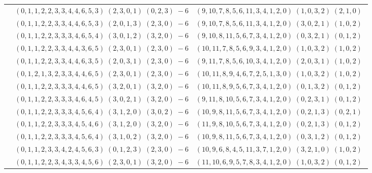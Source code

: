 \documentclass[11pt]{article}
\begin{document}
\begin{longtable}[l]{|c|c|c|}
 \cline{2-3} 
 & $(0 ,1 ,1 ,2 ,2 ,3 ,3 ,4 ,4 ,6 ,5 ,3) \;(2 ,3 ,0 ,1) \;(0 ,2 ,3) \;-6$ & $(9 ,10 ,7 ,8 ,5 ,6 ,11 ,3 ,4 ,1 ,2 ,0) \;(1 ,0 ,3 ,2) \;(2 ,1 ,0) \;$\\ 
 \cline{2-3} 
 & $(0 ,1 ,1 ,2 ,2 ,3 ,3 ,4 ,4 ,6 ,5 ,3) \;(2 ,0 ,1 ,3) \;(2 ,3 ,0) \;-6$ & $(9 ,10 ,7 ,8 ,5 ,6 ,11 ,3 ,4 ,1 ,2 ,0) \;(3 ,0 ,2 ,1) \;(1 ,0 ,2) \;$\\ 
 \cline{2-3} 
 & $(0 ,1 ,1 ,2 ,2 ,3 ,3 ,3 ,4 ,6 ,5 ,4) \;(3 ,0 ,1 ,2) \;(3 ,2 ,0) \;-6$ & $(9 ,10 ,8 ,11 ,5 ,6 ,7 ,3 ,4 ,1 ,2 ,0) \;(0 ,3 ,2 ,1) \;(0 ,1 ,2) \;$\\ 
 \cline{2-3} 
 & $(0 ,1 ,1 ,2 ,2 ,3 ,3 ,4 ,4 ,3 ,6 ,5) \;(2 ,3 ,0 ,1) \;(2 ,3 ,0) \;-6$ & $(10 ,11 ,7 ,8 ,5 ,6 ,9 ,3 ,4 ,1 ,2 ,0) \;(1 ,0 ,3 ,2) \;(1 ,0 ,2) \;$\\ 
 \cline{2-3} 
 & $(0 ,1 ,1 ,2 ,2 ,3 ,3 ,4 ,4 ,6 ,3 ,5) \;(2 ,0 ,3 ,1) \;(2 ,3 ,0) \;-6$ & $(9 ,11 ,7 ,8 ,5 ,6 ,10 ,3 ,4 ,1 ,2 ,0) \;(2 ,0 ,3 ,1) \;(1 ,0 ,2) \;$\\ 
 \cline{2-3} 
 & $(0 ,1 ,2 ,1 ,3 ,2 ,3 ,3 ,4 ,4 ,6 ,5) \;(2 ,3 ,0 ,1) \;(2 ,3 ,0) \;-6$ & $(10 ,11 ,8 ,9 ,4 ,6 ,7 ,2 ,5 ,1 ,3 ,0) \;(1 ,0 ,3 ,2) \;(1 ,0 ,2) \;$\\ 
 \cline{2-3} 
 & $(0 ,1 ,1 ,2 ,2 ,3 ,3 ,3 ,4 ,4 ,6 ,5) \;(3 ,2 ,0 ,1) \;(3 ,2 ,0) \;-6$ & $(10 ,11 ,8 ,9 ,5 ,6 ,7 ,3 ,4 ,1 ,2 ,0) \;(0 ,1 ,3 ,2) \;(0 ,1 ,2) \;$\\ 
 \cline{2-3} 
 & $(0 ,1 ,1 ,2 ,2 ,3 ,3 ,3 ,4 ,6 ,4 ,5) \;(3 ,0 ,2 ,1) \;(3 ,2 ,0) \;-6$ & $(9 ,11 ,8 ,10 ,5 ,6 ,7 ,3 ,4 ,1 ,2 ,0) \;(0 ,2 ,3 ,1) \;(0 ,1 ,2) \;$\\ 
 \cline{2-3} 
 & $(0 ,1 ,1 ,2 ,2 ,3 ,3 ,3 ,4 ,5 ,6 ,4) \;(3 ,1 ,2 ,0) \;(3 ,0 ,2) \;-6$ & $(10 ,9 ,8 ,11 ,5 ,6 ,7 ,3 ,4 ,1 ,2 ,0) \;(0 ,2 ,1 ,3) \;(0 ,2 ,1) \;$\\ 
 \cline{2-3} 
 & $(0 ,1 ,1 ,2 ,2 ,3 ,3 ,3 ,4 ,5 ,4 ,6) \;(3 ,1 ,2 ,0) \;(3 ,2 ,0) \;-6$ & $(11 ,9 ,8 ,10 ,5 ,6 ,7 ,3 ,4 ,1 ,2 ,0) \;(0 ,2 ,1 ,3) \;(0 ,1 ,2) \;$\\ 
 \cline{2-3} 
 & $(0 ,1 ,1 ,2 ,2 ,3 ,3 ,3 ,4 ,5 ,6 ,4) \;(3 ,1 ,0 ,2) \;(3 ,2 ,0) \;-6$ & $(10 ,9 ,8 ,11 ,5 ,6 ,7 ,3 ,4 ,1 ,2 ,0) \;(0 ,3 ,1 ,2) \;(0 ,1 ,2) \;$\\ 
 \cline{2-3} 
 & $(0 ,1 ,1 ,2 ,3 ,3 ,4 ,2 ,4 ,5 ,6 ,3) \;(0 ,1 ,2 ,3) \;(2 ,3 ,0) \;-6$ & $(10 ,9 ,6 ,8 ,4 ,5 ,11 ,3 ,7 ,1 ,2 ,0) \;(3 ,2 ,1 ,0) \;(1 ,0 ,2) \;$\\ 
 \cline{2-3} 
 & $(0 ,1 ,1 ,2 ,2 ,3 ,4 ,3 ,3 ,4 ,5 ,6) \;(2 ,3 ,0 ,1) \;(3 ,2 ,0) \;-6$ & $(11 ,10 ,6 ,9 ,5 ,7 ,8 ,3 ,4 ,1 ,2 ,0) \;(1 ,0 ,3 ,2) \;(0 ,1 ,2) \;$\\ 

\end{longtable}
\end{document}
